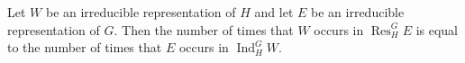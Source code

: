 Let $W$ be an irreducible representation of $H$ and let $E$ be an irreducible representation of $G$. Then the number of times that $W$ occurs in $\operatorname{Res}_H^G E$ is equal to the number of times that $E$ occurs in $\operatorname{Ind}_H^G W$.
